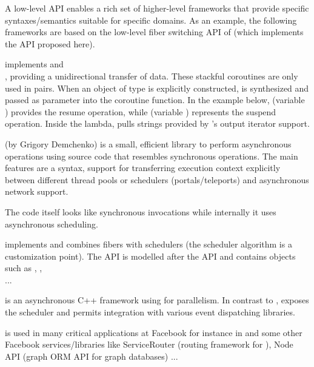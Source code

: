 \label{low_level}

A low-level API enables a rich set of higher-level frameworks that provide
specific syntaxes/semantics suitable for specific domains. As an example, the
following frameworks are based on the low-level fiber switching API of
\bcontext\cite{bcontext} (which implements the API proposed here).

\uabschnitt{\bcoroutine}\cite{bcoroutine2} implements 
 and\\
, providing a
unidirectional transfer of data. These stackful coroutines are only used in
pairs. When an object of type  is explicitly
constructed,  is synthesized and passed as
parameter into the coroutine function. In the
example below,  (variable ) provides the
resume operation, while  (variable )
represents the suspend operation. Inside the lambda,
pulls strings provided by 's output iterator support.

\uabschnitt{\synca}\cite{synca} (by Grigory Demchenko) is a small, efficient
library to perform asynchronous operations using source code that resembles synchronous
operations. The main
features are a  syntax, support for transferring execution context
explicitly between different thread pools or schedulers (portals/teleports) and
asynchronous network support.

The code itself looks like synchronous invocations while internally it uses
asynchronous scheduling.

\uabschnitt{\bfiber}\cite{bfiber} implements  and combines
fibers with schedulers (the scheduler algorithm is a customization point). The API
is modelled after the \thread API and contains objects such as
, ,\\
 ...

\cite{fbfiber} is an asynchronous C++ framework
using  for parallelism. In contrast to \bfiber,
\fbfibers\xspace exposes the scheduler and permits integration with various
event dispatching libraries.

\fbfibers\xspace is used in many critical applications at Facebook for instance
in \fbmcrouter\cite{fbmcrouter} and some other Facebook services/libraries like
ServiceRouter (routing framework for \fbthrift\cite{fbthrift}), Node API (graph
ORM API for graph databases) ...


